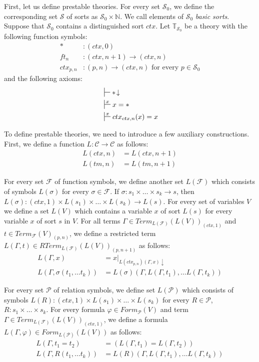\documentclass[reqno]{amsart}
\theoremstyle{definition}
\theoremstyle{remark}
\newcommand{\emptyCtx}{*}
\numberwithin{figure}{section}
\begin{document}
First, let us define prestable theories.
For every set $\mathcal{S}_0$, we define the corresponding set $\mathcal{S}$ of sorts as $\mathcal{S}_0 \times \mathbb{N}$.
We call elements of $\mathcal{S}_0$ \emph{basic sorts}.
Suppose that $\mathcal{S}_0$ contains a distinguished sort $ctx$.
Let $\mathbb{T}_{\mathcal{S}_0}$ be a theory with the following function symbols:
\begin{align*}
\emptyCtx  &: (ctx,0) \\
ft_n & : (ctx,n+1) \to (ctx,n) \\
ctx_{p,n} & : (p,n) \to (ctx,n) \text{ for every } p \in \mathcal{S}_0
\end{align*}
and the following axioms:
\begin{align*}
& \sststile{}{} \emptyCtx\!\downarrow \\
& \sststile{}{x} x = \emptyCtx \\
& \sststile{}{x} ctx_{ctx,n}(x) = x
\end{align*}

To define prestable theories, we need to introduce a few auxiliary constructions.
First, we define a function $L : \mathcal{C} \to \mathcal{C}$ as follows:
\begin{align*}
L(ctx,n) & = L(ctx,n+1) \\
L(tm,n) & = L(tm,n+1)
\end{align*}

For every set $\mathcal{F}$ of function symbols, we define another set $L(\mathcal{F})$ which consists of symbols $L(\sigma)$ for every $\sigma \in \mathcal{F}$.
If $\sigma : s_1 \times \ldots \times s_k \to s$, then $L(\sigma) : (ctx,1) \times L(s_1) \times \ldots \times L(s_k) \to L(s)$.
For every set of variables $V$ we define a set $L(V)$ which contains a variable $x$ of sort $L(s)$ for every variable $x$ of sort $s$ in $V$.
For all terms $\Gamma \in Term_{L(\mathcal{F})}(L(V))_{(ctx,1)}$ and $t \in Term_{\mathcal{F}}(V)_{(p,n)}$,
we define a restricted term $L(\Gamma,t) \in RTerm_{L(\mathcal{F})}(L(V))_{(p,n+1)}$ as follows:
\begin{align*}
L(\Gamma, x) & = x|_{L(ctx_{p,n})(\Gamma, x) \downarrow} \\
L(\Gamma, \sigma(t_1, \ldots t_k)) & = L(\sigma)(\Gamma, L(\Gamma, t_1), \ldots L(\Gamma, t_k))
\end{align*}

For every set $\mathcal{P}$ of relation symbols, we define set $L(\mathcal{P})$ which consists of symbols
    $L(R) : (ctx,1) \times L(s_1) \times \ldots \times L(s_k)$ for every $R \in \mathcal{P}$, $R : s_1 \times \ldots \times s_k$.
For every formula $\varphi \in Form_\mathcal{P}(V)$ and term $\Gamma \in Term_{L(\mathcal{F})}(L(V))_{(ctx,1)}$,
we define a formula $L(\Gamma, \varphi) \in Form_{L(\mathcal{P})}(L(V))$ as follows:
\begin{align*}
L(\Gamma, t_1 = t_2) & = (L(\Gamma, t_1) = L(\Gamma, t_2)) \\
L(\Gamma, R(t_1, \ldots t_k)) & = L(R)(\Gamma, L(\Gamma, t_1), \ldots L(\Gamma, t_k))
\end{align*}
\end{document}
